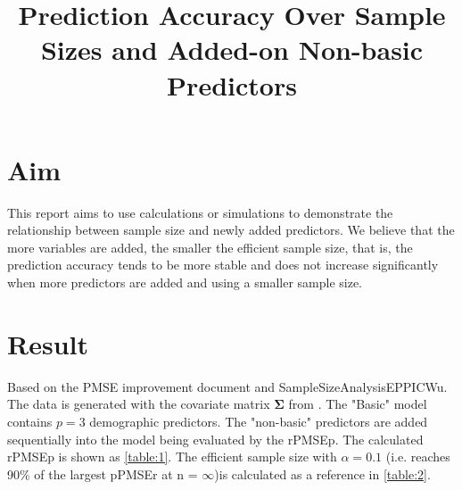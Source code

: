\documentclass[11pt]{article}
\begin{document}
\thispagestyle{fancy}

\title{\bf Prediction Accuracy Over Sample Sizes and Added-on Non-basic Predictors}
\date{}
\maketitle
% 
%
%
%
%
%

\section{Aim}

This report aims to use calculations or simulations to demonstrate the relationship between sample size and newly added predictors. We believe that the more variables are added, the smaller the efficient sample size, that is, the prediction accuracy tends to be more stable and does not increase significantly when more predictors are added and using a smaller sample size.

\section{Result}


Based on the PMSE improvement document and SampleSizeAnalysisEPPICWu. The data is generated with the covariate matrix $\boldsymbol{\Sigma}$ from \cite{baker2008chronicpain}. The "Basic" model contains $p=3$ demographic predictors.
The "non-basic" predictors are added sequentially into the model being evaluated by the rPMSEp. The calculated rPMSEp is shown as \ref{table:1}. The efficient sample size with $\alpha = 0.1$ (i.e. reaches 90\% of the largest pPMSEr at n = $\infty$)is calculated as a reference in  \ref{table:2}.
\end{document}
